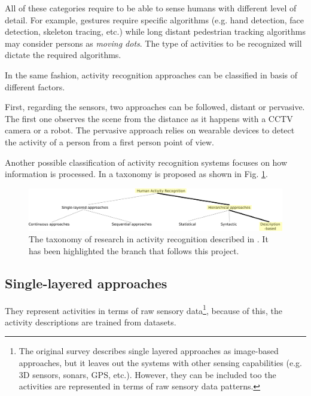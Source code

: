 All of these categories require to be able to sense humans with different level of detail.
For example, gestures require specific algorithms (e.g. hand detection, face detection, skeleton tracing, etc.) while long distant pedestrian tracking algorithms may consider persons as \textit{moving dots}.
The type of activities to be recognized will dictate the required algorithms.

In the same fashion, activity recognition approaches can be classified in basis of different factors.

First, regarding the sensors, two approaches can be followed, distant or pervasive. 
The first one observes the scene from the distance as it happens with a CCTV camera or a robot. 
The pervasive approach relies on wearable devices to detect the activity of a person from a first person point of view.

Another possible classification of activity recognition systems focuses on how information is processed.
In \citep{Aggarwal11_HumanActivity} a taxonomy is proposed as shown in Fig. \ref{fig:taxonomy}.  

\begin{figure}[h]
\centering
\includegraphics[width=\textwidth]{fig/img_Aggarwal_Taxonomy3.pdf}
\caption{The taxonomy of research in activity recognition described in \cite{Aggarwal11_HumanActivity}. It has been highlighted the branch that follows this project.}
\label{fig:taxonomy}
\end{figure}

\subsection{Single-layered approaches}
They represent activities in terms of raw sensory data\footnote{The original survey \citep{Aggarwal11_HumanActivity} describes single layered approaches as image-based approaches, but it leaves out the systems with other sensing capabilities (e.g. 3D sensors, sonars, GPS, etc.).
However, they can be included too the activities are represented in terms of raw sensory data patterns.}, because of this, the activity descriptions are trained from datasets.


